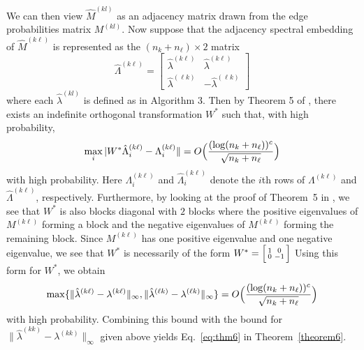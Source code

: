 \documentclass[12pt]{article}
\begin{document}
We can then view \(\hat{M}^{(kl)}\) as an adjacency matrix drawn from
the edge probabilities matrix \(M^{(kl)}\). Now suppose that the adjacency spectral
embedding of $\hat{M}^{(k \ell)}$ is represented as the $(n_k +
n_{\ell}) \times 2$ matrix
\[\hat{\Lambda}^{(k \ell)} = \begin{bmatrix} 
  \hat{\lambda}^{(k \ell)} & \hat{\lambda}^{(k \ell)} \\ 
  \hat{\lambda}^{(\ell k)} & -\hat{\lambda}^{(\ell k)} 
\end{bmatrix}\]
where each \(\hat{\lambda}^{(kl)}\) is defined as in Algorithm 3. Then
by Theorem 5 of \citeauthor{rubindelanchy2017statistical}, there
exists an indefinite orthogonal transformation $W^{*}$ such that,  with
high probability,
$$\max_{i} |W^{*} \hat{\Lambda}_{i}^{(k \ell)} - \Lambda_{i}^{(k \ell)} \| =
O\Bigl(\frac{(\log (n_k + n_{\ell}))^c}{\sqrt{n_k + n_{\ell}}}\Bigr)$$
with high probability. Here $\Lambda_{i}^{(k \ell)}$ and
$\hat{\Lambda}_i^{(k \ell)}$ denote the $i$th rows of $\Lambda^{(k
  \ell)}$ and $\hat{\Lambda}^{(k \ell)}$, respectively. 
Furthermore, by looking at the proof of Theorem~5 in
\cite{rubindelanchy2017statistical}, we see that $W^{*}$ is also
blocks diagonal with $2$ blocks where the positive eigenvalues of $M^{(k \ell)}$
forming a block and the negative eigenvalues of $M^{(k \ell)}$ forming
the remaining block. %
Since $M^{(k \ell)}$ has one positive eigenvalue and one negative
eigenvalue, we see that $W^{*}$ is necessarily of the form $W^{*}
= \Bigl[\begin{smallmatrix} 1 & 0 \\ 0 & - 1\end{smallmatrix}\Bigr]$
Using this form for $W^{*}$, we obtain
$$\max\{\|\hat{\lambda}^{(k \ell)} - \lambda^{(k \ell)}\|_{\infty},
\|\hat{\lambda}^{(\ell k)} - \lambda^{(\ell k)}\|_{\infty}\}  =
O\Bigl(\frac{(\log (n_k + n_{\ell}))^c}{\sqrt{n_k + n_{\ell}}}\Bigr)$$
with high probability. Combining this bound with the bound for
$\|\hat{\lambda}^{(kk)} - \lambda^{(kk)}\|_{\infty}$ given above
yields Eq.~\eqref{eq:thm6} in Theorem~\ref{theorem6}. 
\end{document}
